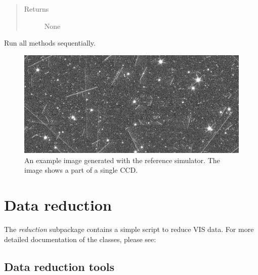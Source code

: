 \documentclass[a4paper,11pt,english]{sphinxmanual}
\begin{document}
\begin{fulllineitems}
\begin{fulllineitems}
\begin{quote}
\begin{description}
\item[{Returns}] \leavevmode
None

\end{description}\end{quote}

\end{fulllineitems}


\begin{fulllineitems}
\label{simulator:simulator.generateGalaxies.generateFakeData.runAll}
Run all methods sequentially.

\end{fulllineitems}


\end{fulllineitems}

\begin{figure}[htbp]
\centering
\capstart

\includegraphics{simu.pdf}
\caption{An example image generated with the reference simulator. The image shows a part of a single
CCD.}\end{figure}


\chapter{Data reduction}
\label{index:data-reduction}
The \emph{reduction} subpackage contains a simple script to reduce VIS data. For more detailed documentation
of the classes, please see:


\section{Data reduction tools}
\label{reduction:module-reduction.reduceVISdata}\label{reduction::doc}\label{reduction:data-reduction-tools}
\end{document}
